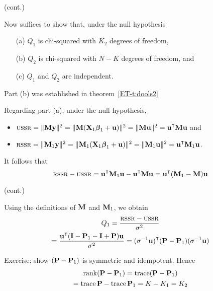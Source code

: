 \begin{frame}

    \vspace{2em}
    \Prf (cont.)
    
    Now suffices
    to show that, under the null hypothesis
    \begin{itemize}
        \item[(a)] $Q_1$ is chi-squared with $K_2$ degrees of freedom,
        \item[(b)] $Q_2$ is chi-squared with $N - K$ degrees of freedom, and
        \item[(c)] $Q_1$ and $Q_2$ are independent.
    \end{itemize}
    Part (b) was established in theorem~\ref{ET-t:dools2}
    
    Regarding part (a), under the null hypothesis, 
    \begin{itemize}
        \item $\ussr = \| \boldM \boldy \|^2 = \| \boldM (\boldX_1 \boldbeta_1
            + \boldu) \|^2 = \| \boldM \boldu \|^2 = \boldu^\T \boldM \boldu$ and 
        \item $\rssr = \| \boldM_1 \boldy \|^2 = \| \boldM_1 (\boldX_1 \boldbeta_1 +
            \boldu)\|^2 = \| \boldM_1 \boldu \|^2 = \boldu^\T \boldM_1
            \boldu$.
    \end{itemize}
    
    \vspace{.7em}
    It follows that
    \begin{equation*}
        \rssr - \ussr 
        = \boldu^\T \boldM_1 \boldu  - \boldu^\T \boldM \boldu 
        = \boldu^\T (\boldM_1 - \boldM) \boldu 
    \end{equation*}
    
\end{frame}

\begin{frame}

    \vspace{2em}
    \Prf (cont.)
    
    Using the definitions of $\mathbf M$ and $\mathbf M_1$, we obtain
    \begin{multline*}
        Q_1 =
        \frac{\rssr - \ussr}{\sigma^2}
        \\ = \frac{\boldu^\T (\boldI - \boldP_1 - \boldI + \boldP) \boldu}{\sigma^2}
        = (\sigma^{-1} \boldu)^\T (\boldP - \boldP_1) (\sigma^{-1} \boldu)
    \end{multline*}
    
    \vspace{.7em}
    Exercise: show $(\mathbf P - \mathbf P_1)$ is symmetric and
    idempotent. Hence
    \begin{multline*}
        \operatorname{rank}(\mathbf P - \mathbf P_1)
        = \operatorname{trace}(\mathbf P - \mathbf P_1)
       \\ = \operatorname{trace} \mathbf P - \operatorname{trace} \mathbf P_1
        = K - K_1 = K_2
    \end{multline*}
   
\end{frame}


